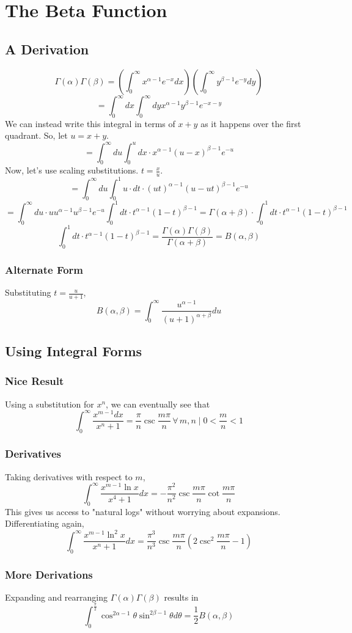 \documentclass[../main.tex]{subfiles}
\begin{document}
\chapter{The Beta Function}
\section{A Derivation}
    $$\Gamma(\alpha)\Gamma(\beta)=\left(\int_{0}^{\infty}x^{\alpha-1}e^{-x}dx\right)\left(\int_{0}^{\infty}y^{\beta-1}e^{-y}dy\right)$$
    $$=\int_{0}^{\infty}dx\int_{0}^{\infty}dy x^{\alpha-1}y^{\beta-1}e^{-x-y}$$
    We can instead write this integral in terms of $x+y$ as it happens over the first quadrant. So, let $u=x+y$.
    $$=\int_{0}^{\infty}du\int_{0}^{u}dx\cdot x^{\alpha-1}(u-x)^{\beta-1}e^{-u}$$
    Now, let's use scaling substitutions. $t=\frac{x}{u}$.
    $$=\int_{0}^{\infty}du\int_{0}^{1}u\cdot dt\cdot (ut)^{\alpha-1}(u-ut)^{\beta-1}e^{-u}$$
    $$=\int_{0}^{\infty}du\cdot u u^{\alpha-1}u^{\beta-1}e^{-u}\int_{0}^{1}dt\cdot t^{\alpha-1}(1-t)^{\beta-1}=\Gamma(\alpha+\beta)\cdot\int_{0}^{1}dt\cdot t^{\alpha-1}(1-t)^{\beta-1}$$
    $$\boxed{\int_{0}^{1}dt\cdot t^{\alpha-1}(1-t)^{\beta-1}=\frac{\Gamma(\alpha)\Gamma(\beta)}{\Gamma(\alpha+\beta)}=B(\alpha,\beta)}$$

    \subsection{Alternate Form}
        Substituting $t=\frac{u}{u+1}$,
        $$B(\alpha, \beta)=\int_{0}^{\infty}\frac{u^{\alpha-1}}{(u+1)^{\alpha+\beta}}du$$

\section{Using Integral Forms}
    \subsection{Nice Result}
        Using a substitution for $x^n$, we can eventually see that
        $$\int_{0}^{\infty}\frac{x^{m-1}dx}{x^{n}+1}=\frac{\pi}{n}\csc\frac{m\pi}{n}\,\forall\, m,n\mid 0<\frac{m}{n}<1$$

    \subsection{Derivatives}
        Taking derivatives with respect to $m$,
        $$\int_{0}^{\infty}\frac{x^{m-1}\ln x}{x^4 + 1}dx=-\frac{\pi^{2}}{n^2}\csc\frac{m\pi}{n}\cot\frac{m\pi}{n}$$
        This gives us access to "natural logs" without worrying about expansions.
        Differentiating again,
        $$\int_{0}^{\infty}\frac{x^{m-1}\ln^{2}x}{x^{n}+1}dx=\frac{\pi^{3}}{n^{3}}\csc\frac{m\pi}{n}\left(2\csc^{2}\frac{m\pi}{n}-1\right)$$
    
    \subsection{More Derivations}
        Expanding and rearranging $\Gamma(\alpha)\Gamma(\beta)$ results in
        $$\int_{0}^{\frac{\pi}{2}}\cos^{2\alpha-1}\theta\sin^{2\beta-1}\theta d\theta=\frac{1}{2}B(\alpha,\beta)$$
\end{document}
